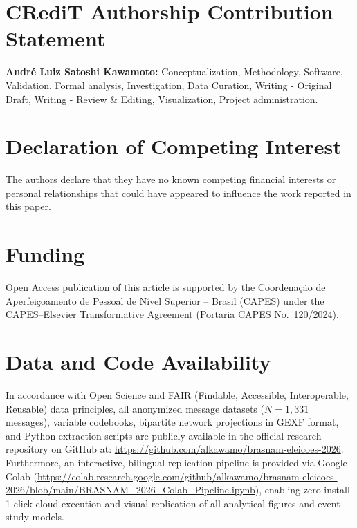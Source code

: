 \documentclass[preprint,12pt]{elsarticle}
\begin{document}
\section*{CRediT Authorship Contribution Statement}
\textbf{André Luiz Satoshi Kawamoto:} Conceptualization, Methodology, Software, Validation, Formal analysis, Investigation, Data Curation, Writing - Original Draft, Writing - Review \& Editing, Visualization, Project administration.

\section*{Declaration of Competing Interest}
The authors declare that they have no known competing financial interests or personal relationships that could have appeared to influence the work reported in this paper.

\section*{Funding}
Open Access publication of this article is supported by the Coordenação de Aperfeiçoamento de Pessoal de Nível Superior -- Brasil (CAPES) under the CAPES--Elsevier Transformative Agreement (Portaria CAPES No.\ 120/2024).

\section*{Data and Code Availability}
In accordance with Open Science and FAIR (Findable, Accessible, Interoperable, Reusable) data principles, all anonymized message datasets ($N=1,331$ messages), variable codebooks, bipartite network projections in GEXF format, and Python extraction scripts are publicly available in the official research repository on GitHub at: \url{https://github.com/alkawamo/brasnam-eleicoes-2026}. Furthermore, an interactive, bilingual replication pipeline is provided via Google Colab (\url{https://colab.research.google.com/github/alkawamo/brasnam-eleicoes-2026/blob/main/BRASNAM_2026_Colab_Pipeline.ipynb}), enabling zero-install 1-click cloud execution and visual replication of all analytical figures and event study models.



\end{document}
